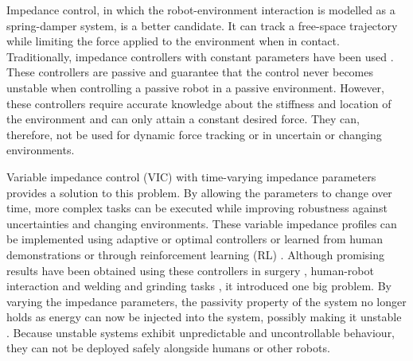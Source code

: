 Impedance control, in which the robot-environment interaction is modelled as a spring-damper system, is a better candidate. It can track a free-space trajectory while limiting the force applied to the environment when in contact. Traditionally, impedance controllers with constant parameters have been used \cite{hoganImpedanceControlApproach1985,hoganStableExecutionContact1987,calancaReviewAlgorithmsCompliant2016,songTutorialSurveyComparison2019,cheahLearningImpedanceControl1998,liHumanRobotCollaboration2013,heAdaptiveNeuralImpedance2015,liAdaptiveImpedanceControl2016,jamwalImpedanceControlIntrinsically2016,jungForceTrackingImpedance2004,ottPrioritizedMultitaskCompliance2015}. These controllers are passive and guarantee that the control never becomes unstable when controlling a passive robot in a passive environment. However, these controllers require accurate knowledge about the stiffness and location of the environment and can only attain a constant desired force. They can, therefore, not be used for dynamic force tracking or in uncertain or changing environments.

Variable impedance control (VIC) with time-varying impedance parameters provides a solution to this problem. By allowing the parameters to change over time, more complex tasks can be executed while improving robustness against uncertainties and changing environments. These variable impedance profiles can be implemented using adaptive or optimal controllers \cite{songTutorialSurveyComparison2019,erdenAssistingManualWelding2011,erdenRoboticAssistanceImpedance2016,leeForceTrackingImpedance2008,ikeuraOptimalVariableImpedance2002,medinaRisksensitiveInteractionControl2013,yangHumanlikeAdaptationForce2011} or learned from human demonstrations or through reinforcement learning (RL) \cite{buchliLearningVariableImpedance2011,rombokasTendondrivenVariableImpedance2013,michelBilateralTeleoperationAdaptive2021,chenClosedLoopVariableStiffness2021,weiImpedanceControlUncertain2019,houVariableImpedanceControl2020,abu-dakkaVariableImpedanceControl2020,calinonLearningbasedControlStrategy2010,kronanderOnlineLearningVarying2012}. Although promising results have been obtained using these controllers in surgery \cite{ferragutiEnergyTankBasedInteractive2015, ferragutiTankbasedApproachImpedance2013}, human-robot interaction \cite{wuAdaptiveImpedanceControl2020,san-miguelAutomatedOffLineGeneration2022,sharifiImpedanceLearningBasedAdaptive2021} and welding and grinding tasks \cite{erdenAssistingManualWelding2011,erdenRoboticAssistanceImpedance2016,zhangLearningImpedanceRegulation2021,wangSafeOnlineGain2021}, it introduced one big problem. By varying the impedance parameters, the passivity property of the system no longer holds as energy can now be injected into the system, possibly making it unstable \cite{ferragutiTankbasedApproachImpedance2013}. Because unstable systems exhibit unpredictable and uncontrollable behaviour, they can not be deployed safely alongside humans or other robots.

